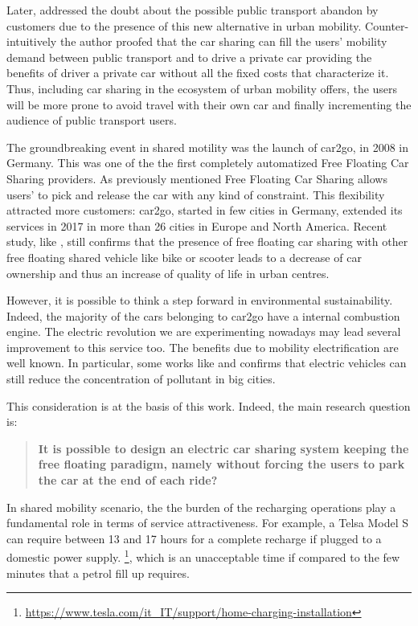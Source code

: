 Later, \cite{2_huwer2004public} addressed the doubt about the possible public transport abandon by customers due to the presence of this new alternative in urban mobility. Counter-intuitively the author proofed that the car sharing can fill the users' mobility demand between public transport and to drive a private car providing the benefits of driver a private car without all the fixed costs that characterize it. Thus, including car sharing in the ecosystem of urban mobility offers, the users will be more prone to avoid travel with their own car and finally incrementing the audience of public transport users.

The groundbreaking event in shared motility was the launch of car2go, in 2008 in Germany. This was one of the the first completely automatized Free Floating Car Sharing providers. As previously mentioned Free Floating Car Sharing allows users' to pick and release the car with any kind of constraint. This flexibility attracted more customers: car2go, started in few cities in Germany, extended its services in 2017 in more than 26 cities in Europe and North America. Recent study, like \cite{9_jochem2020does}, still confirms that the presence of free floating car sharing with other free floating shared vehicle like bike or scooter leads to a decrease of car ownership and thus an increase of quality of life in urban centres.

However, it is possible to think a step forward in environmental sustainability. Indeed, the majority of the cars belonging to car2go have a internal combustion engine. The electric revolution we are experimenting nowadays may lead several improvement to this service too. The benefits due to mobility electrification are well known. In particular, some works like \cite{3_oxley2012pollution} and \cite{4_mao2012achieving} confirms that electric vehicles can still reduce the concentration of pollutant in big cities.

This consideration is at the basis of this work. Indeed, the main research question is:
\begin{quote}
	\centering
	\textbf{It is possible to design an electric car sharing system keeping the free floating paradigm, namely without forcing the users to park the car at the end of each ride?}
\end{quote}

In shared mobility scenario, the the burden of the recharging operations play a fundamental role in terms of service attractiveness. For example, a Telsa Model S can require between 13 and 17 hours for a complete recharge if plugged to a domestic power supply. \footnote{\url{https://www.tesla.com/it_IT/support/home-charging-installation}}, which is an unacceptable time if compared to the few minutes that a petrol fill up requires. 

